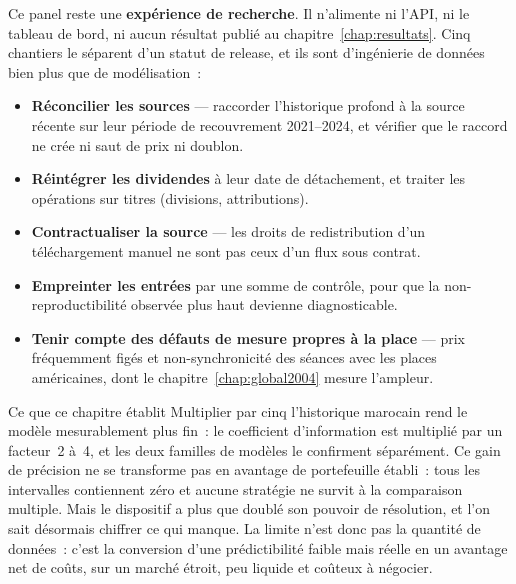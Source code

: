 Ce panel reste une \textbf{expérience de recherche}. Il n'alimente ni l'API, ni
le tableau de bord, ni aucun résultat publié au chapitre~\ref{chap:resultats}.
Cinq chantiers le séparent d'un statut de release, et ils sont d'ingénierie de
données bien plus que de modélisation~:

\begin{itemize}
  \item \textbf{Réconcilier les sources} — raccorder l'historique profond à la
        source récente sur leur période de recouvrement 2021--2024, et vérifier
        que le raccord ne crée ni saut de prix ni doublon.
  \item \textbf{Réintégrer les dividendes} à leur date de détachement, et traiter
        les opérations sur titres (divisions, attributions).
  \item \textbf{Contractualiser la source} — les droits de redistribution d'un
        téléchargement manuel ne sont pas ceux d'un flux sous contrat.
  \item \textbf{Empreinter les entrées} par une somme de contrôle, pour que la
        non-reproductibilité observée plus haut devienne diagnosticable.
  \item \textbf{Tenir compte des défauts de mesure propres à la place} — prix
        fréquemment figés et non-synchronicité des séances avec les places
        américaines, dont le chapitre~\ref{chap:global2004} mesure l'ampleur.
\end{itemize}

\begin{resultatbox}{Ce que ce chapitre établit}
Multiplier par cinq l'historique marocain rend le modèle mesurablement plus
fin~: le coefficient d'information est multiplié par un facteur~2 à~4, et les
deux familles de modèles le confirment séparément. Ce gain de précision ne se
transforme pas en avantage de portefeuille établi~: tous les intervalles
contiennent zéro et aucune stratégie ne survit à la comparaison multiple. Mais
le dispositif a plus que doublé son pouvoir de résolution, et l'on sait
désormais chiffrer ce qui manque. La limite n'est donc pas la quantité de
données~: c'est la conversion d'une prédictibilité faible mais réelle en un
avantage net de coûts, sur un marché étroit, peu liquide et coûteux à négocier.
\end{resultatbox}
